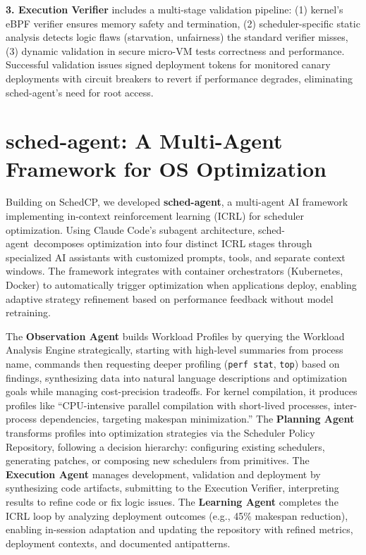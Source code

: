 \documentclass[preprint]{article}
\newcommand{\sys}{SchedCP\xspace}
\newcommand{\agent}{sched-agent\xspace}
\begin{document}
\textbf{3. Execution Verifier} includes a multi-stage validation pipeline: (1) kernel's eBPF verifier ensures memory safety and termination, (2) scheduler-specific static analysis detects logic flaws (starvation, unfairness) the standard verifier misses, (3) dynamic validation in secure micro-VM tests correctness and performance. Successful validation issues signed deployment tokens for monitored canary deployments with circuit breakers to revert if performance degrades, eliminating \agent's need for root access.

\section{\agent: A Multi-Agent Framework for OS Optimization}
\label{sec:sched_agents}

Building on \sys, we developed \textbf{\agent}, a multi-agent AI framework implementing in-context reinforcement learning (ICRL)\cite{incontextrl} for scheduler optimization. Using Claude Code's subagent architecture\cite{anthropic2024subagents}, \agent\ decomposes optimization into four distinct ICRL stages through specialized AI assistants with customized prompts, tools, and separate context windows\cite{anthropic2024multiagent}. The framework integrates with container orchestrators (Kubernetes, Docker) to automatically trigger optimization when applications deploy, enabling adaptive strategy refinement based on performance feedback without model retraining.

The \textbf{Observation Agent} builds Workload Profiles by querying the Workload Analysis Engine strategically, starting with high-level summaries from process name, commands then requesting deeper profiling (\texttt{perf stat}, \texttt{top}) based on findings, synthesizing data into natural language descriptions and optimization goals while managing cost-precision tradeoffs. For kernel compilation, it produces profiles like ``CPU-intensive parallel compilation with short-lived processes, inter-process dependencies, targeting makespan minimization.'' The \textbf{Planning Agent} transforms profiles into optimization strategies via the Scheduler Policy Repository, following a decision hierarchy: configuring existing schedulers, generating patches, or composing new schedulers from primitives. The \textbf{Execution Agent} manages development, validation and deployment by synthesizing code artifacts, submitting to the Execution Verifier, interpreting results to refine code or fix logic issues. The \textbf{Learning Agent} completes the ICRL loop by analyzing deployment outcomes (e.g., 45\% makespan reduction), enabling in-session adaptation and updating the repository with refined metrics, deployment contexts, and documented antipatterns.
\end{document}
